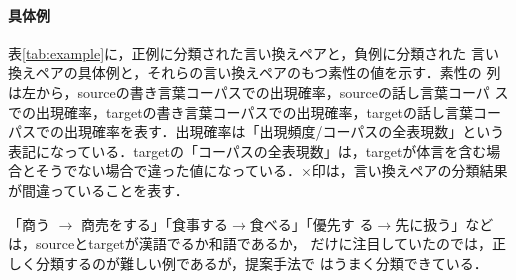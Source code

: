 \documentclass{nlp}
\begin{document}
\paragraph{具体例}
表\ref{tab:example}に，正例に分類された言い換えペアと，負例に分類された
言い換えペアの具体例と，それらの言い換えペアのもつ素性の値を示す．素性の
列は左から，sourceの書き言葉コーパスでの出現確率，sourceの話し言葉コーパ
スでの出現確率，targetの書き言葉コーパスでの出現確率，targetの話し言葉コー
パスでの出現確率を表す．出現確率は「出現頻度/コーパスの全表現数」という
表記になっている．targetの「コーパスの全表現数」は，targetが体言を含む場
合とそうでない場合で違った値になっている．×印は，言い換えペアの分類結果
が間違っていることを表す．

「商う $\rightarrow$ 商売をする」「食事する$\rightarrow$食べる」「優先す
る$\rightarrow$先に扱う」などは，sourceとtargetが漢語でるか和語であるか，
だけに注目していたのでは，正しく分類するのが難しい例であるが，提案手法で
はうまく分類できている．
\end{document}
